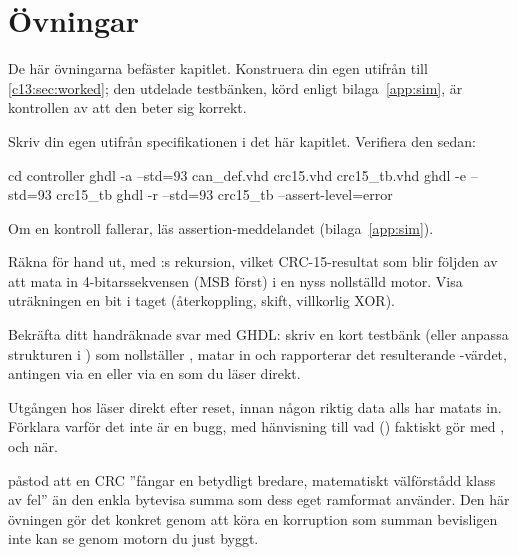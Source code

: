 
\section{Övningar}
\label{c13:sec:exercises}

\begin{aside}
De här övningarna befäster kapitlet. Konstruera din egen  utifrån
 till \ref{c13:sec:worked}; den utdelade testbänken, körd enligt
bilaga~\ref{app:sim}, är kontrollen av att den beter sig korrekt.
\end{aside}

\label{c13:ex:crc15}
Skriv din egen  utifrån specifikationen i det här kapitlet. Verifiera den sedan:

\begin{shell}
cd controller
ghdl -a --std=93 can_def.vhd crc15.vhd crc15_tb.vhd
ghdl -e --std=93 crc15_tb
ghdl -r --std=93 crc15_tb --assert-level=error
\end{shell}

Om en kontroll fallerar, läs assertion-meddelandet (bilaga~\ref{app:sim}).

\label{c13:ex:byhand}
 Räkna för hand ut, med :s rekursion, vilket CRC-15-resultat som
blir följden av att mata in 4-bitarssekvensen  (MSB först) i en nyss nollställd motor.
Visa uträkningen en bit i taget (återkoppling, skift, villkorlig XOR).

 Bekräfta ditt handräknade svar med GHDL: skriv en kort testbänk (eller anpassa strukturen i
) som nollställer , matar in  och rapporterar det
resulterande -värdet, antingen via en  eller via en
 som du läser direkt.

 Utgången  hos  läser  direkt efter reset, innan någon
riktig data alls har matats in. Förklara varför det inte är en bugg, med hänvisning till vad
 () faktiskt gör med , och när.

\label{c13:ex:missed}
 påstod att en CRC ”fångar en betydligt bredare, matematiskt välförstådd
klass av fel” än den enkla bytevisa summa som dess eget ramformat använder. Den här övningen gör det
konkret genom att köra en korruption som summan bevisligen inte kan se genom motorn du just byggt.

